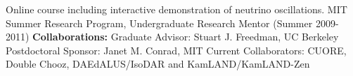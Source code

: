 Online course including interactive demonstration of neutrino oscillations.
\newline\newline \noindent
MIT Summer Research Program, Undergraduate Research Mentor (Summer 2009-2011)
\newline\newline \noindent
{\bf  Collaborations:}
\newline \noindent
Graduate Advisor: Stuart J. Freedman, UC Berkeley
\newline \noindent
Postdoctoral Sponsor: Janet M. Conrad, MIT
\newline \noindent
Current Collaborators:
\newline \noindent
CUORE, Double Chooz, DAEdALUS/IsoDAR and KamLAND/KamLAND-Zen



